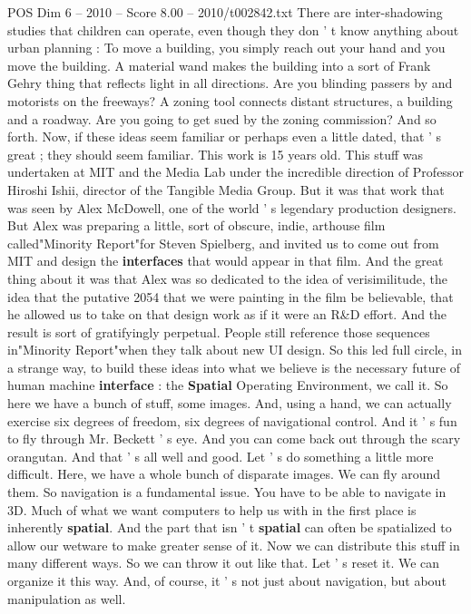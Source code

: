 \begin{textsample}{POS Dim 6 – 2010 – Score 8.00 – 2010/t002842.txt}
There are inter-shadowing studies that children can operate, even though they don ' t know anything about urban planning : To move a building, you simply reach out your hand and you move the building.
A material wand makes the building into a sort of Frank Gehry thing that reflects light in all directions.
Are you blinding passers by and motorists on the freeways?
A zoning tool connects distant structures, a building and a roadway.
Are you going to get sued by the zoning commission?
And so forth.
Now, if these ideas seem familiar or perhaps even a little dated, that ' s great ; they should seem familiar.
This work is 15 years old.
This stuff was undertaken at MIT and the Media Lab under the incredible direction of Professor Hiroshi Ishii, director of the Tangible Media Group.
But it was that work that was seen by Alex McDowell, one of the world ' s legendary production designers.
But Alex was preparing a little, sort of obscure, indie, arthouse film called"Minority Report"for Steven Spielberg, and invited us to come out from MIT and design the \textbf{interfaces} that would appear in that film.
And the great thing about it was that Alex was so dedicated to the idea of verisimilitude, the idea that the putative 2054 that we were painting in the film be believable, that he allowed us to take on that design work as if it were an R\&D effort.
And the result is sort of gratifyingly perpetual.
People still reference those sequences in"Minority Report"when they talk about new UI design.
So this led full circle, in a strange way, to build these ideas into what we believe is the necessary future of human machine \textbf{interface} : the \textbf{Spatial} Operating Environment, we call it.
So here we have a bunch of stuff, some images.
And, using a hand, we can actually exercise six degrees of freedom, six degrees of navigational control.
And it ' s fun to fly through Mr.
Beckett ' s eye.
And you can come back out through the scary orangutan.
And that ' s all well and good.
Let ' s do something a little more difficult.
Here, we have a whole bunch of disparate images.
We can fly around them.
So navigation is a fundamental issue.
You have to be able to navigate in 3D.
Much of what we want computers to help us with in the first place is inherently \textbf{spatial}.
And the part that isn ' t \textbf{spatial} can often be spatialized to allow our wetware to make greater sense of it.
Now we can distribute this stuff in many different ways.
So we can throw it out like that.
Let ' s reset it.
We can organize it this way.
And, of course, it ' s not just about navigation, but about manipulation as well.

\end{textsample}
